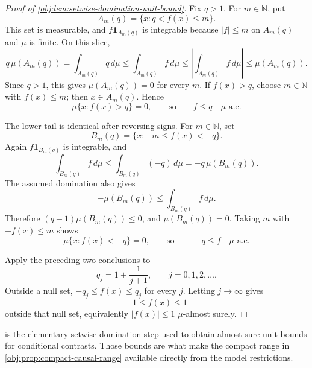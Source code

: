\documentclass[11pt]{article}
\begin{document}
\begin{proof}[Proof of \cref{obj:lem:setwise-domination-unit-bound}]
Fix \(q>1\).  For \(m\in\mathbb N\), put
\[
A_m(q)=\{x:q<f(x)\le m\}.
\]
This set is measurable, and \(f\mathbf 1_{A_m(q)}\) is integrable because \(|f|\le m\) on \(A_m(q)\) and \(\mu\) is finite.  On this slice,
\[
q\,\mu(A_m(q))
=
\int_{A_m(q)}q\,d\mu
\le
\int_{A_m(q)}f\,d\mu
\le
\left|\int_{A_m(q)}f\,d\mu\right|
\le
\mu(A_m(q)).
\]
Since \(q>1\), this gives \(\mu(A_m(q))=0\) for every \(m\). %
If \(f(x)>q\), choose \(m\in\mathbb N\) with \(f(x)\le m\); then \(x\in A_m(q)\).  Hence
\[
\mu\{x:f(x)>q\}=0,
\qquad\text{so}\qquad
f\le q\quad \mu\text{-a.e.}
\]

The lower tail is identical after reversing signs.  For \(m\in\mathbb N\), set
\[
B_m(q)=\{x:-m\le f(x)<-q\}.
\]
Again \(f\mathbf 1_{B_m(q)}\) is integrable, and
\[
\int_{B_m(q)}f\,d\mu
\le
\int_{B_m(q)}(-q)\,d\mu
=
-q\,\mu(B_m(q)).
\]
The assumed domination also gives
\[
-\mu(B_m(q))
\le
\int_{B_m(q)}f\,d\mu.
\]
Therefore \((q-1)\mu(B_m(q))\le0\), and \(\mu(B_m(q))=0\).  Taking \(m\) with \(-f(x)\le m\) shows
\[
\mu\{x:f(x)<-q\}=0,
\qquad\text{so}\qquad
-q\le f\quad \mu\text{-a.e.}
\]

Apply the preceding two conclusions to
\[
q_j=1+\frac{1}{j+1},\qquad j=0,1,2,\ldots .
\]
Outside a null set, \(-q_j\le f(x)\le q_j\) for every \(j\).  Letting \(j\to\infty\) gives
\[
-1\le f(x)\le 1
\]
outside that null set, equivalently \(|f(x)|\le1\) \(\mu\)-almost surely. %
\end{proof}

 is the elementary setwise domination step used to obtain almost-sure unit bounds for conditional contrasts. Those bounds are what make the compact range in \cref{obj:prop:compact-causal-range} available directly from the model restrictions.
\end{document}
